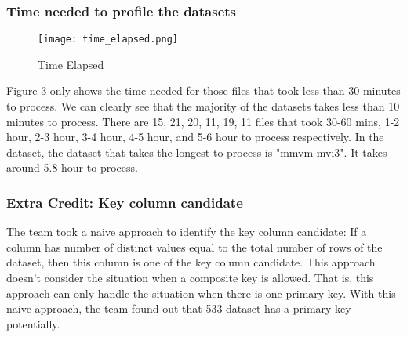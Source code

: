 \documentclass[sigconf]{acmart}
\begin{document}
\subsubsection{Time needed to profile the datasets}
\begin{figure}[htp]
    \centering
    \texttt{[image: time\_elapsed.png]}
    \caption{Time Elapsed}
    \label{fig:galaxy}
\end{figure}
Figure 3 only shows the time needed for those files that took less than 30 minutes to process. We can clearly see that the majority of the datasets takes less than 10 minutes to process. There are 15, 21, 20, 11, 19, 11 files that took 30-60 mins, 1-2 hour, 2-3 hour, 3-4 hour, 4-5 hour, and 5-6 hour to process respectively. In the dataset, the dataset that takes the longest to process is "mmvm-mvi3". It takes around 5.8 hour to process.
\subsubsection{Extra Credit: Key column candidate} The team took a naive approach to identify the key column candidate: If a column has number of distinct values equal to the total number of rows of the dataset, then this column is one of the key column candidate. This approach doesn't consider the situation when a composite key is allowed. That is, this approach can only handle the situation when there is one primary key. With this naive approach, the team found out that 533 dataset has a primary key potentially.
\end{document}
